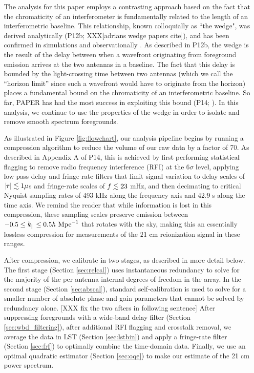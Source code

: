 \documentclass[twocolumn,numberedappendix]{emulateapj} \shorttitle{New Limits on the 21 cm Power Spectrum at $z=8.4$}
\newcommand{\hMpci}{h\ {\rm Mpc}^{-1}}
\begin{document}
The analysis for this paper employs a contrasting
approach based on the fact that the chromaticity of an interferometer
is fundamentally related to the length of an interferometric baseline.  This relationship, known
colloquially as ``the wedge", was 
derived analytically (P12b; \citealt{vedantham_et_al2012}XXX[adrians wedge papers cite]), and has been confirmed in 
simulations \citep{datta_et_al2010,hazelton_et_al2013} and observationally
\citep{pober_et_al2013,dillon_et_al2013b}.  As described in P12b, the wedge is the result of the delay
between when a wavefront originating from foreground emission
arrives at the two antennas in a baseline.  The fact that this delay is bounded by the light-crossing
time between two antennas (which we call the ``horizon limit'' since such a wavefront would have to 
originate from the horizon) places a fundamental bound on the chromaticity of
an interferometric baseline.  So far, PAPER has had the most success in exploiting this bound
(P14; \citealt{jacobs_et_al2014}). 
In this analysis, we continue to use the properties of the 
wedge in order to isolate and remove smooth
spectrum foregrounds.

As illustrated in Figure \ref{fig:flowchart},
our analysis pipeline begins by running a compression
algorithm to reduce the volume of our raw data by a factor of 70.
As described in Appendix A of P14, this is achieved by first performing statistical flagging to remove
radio frequency interference (RFI) at the 6$\sigma$ level, applying low-pass delay and fringe-rate filters that limit signal variation
to delay scales of $|\tau|\lesssim1 \mu$s and fringe-rate scales of $f\lesssim23$ mHz, and then 
decimating to critical Nyquist sampling rates of 493 kHz along the frequency axis
and 42.9 s along the time axis.  We remind the reader that while information is lost in this compression,
these sampling scales preserve emission between
$-0.5\le k_\parallel\le 0.5\hMpci$ that rotates with the sky, making this an essentially lossless compression 
for measurements of the 21 cm reionization signal in these ranges.

After compression, we calibrate in two stages, as described in more detail below.  
The first stage (Section \ref{sec:relcal}) uses instantaneous redundancy to solve for the majority of the 
per-antenna internal degrees of freedom in the array.  In the second stage (Section \ref{sec:abscal}), standard self-calibration is used 
to solve for a smaller number of
absolute phase and gain parameters that cannot be solved by redundancy alone. 
[XXX fix the two afters in following sentence]
After suppressing foregrounds with a
wide-band delay filter (Section \ref{sec:wbd_filtering}), after additional RFI flagging and crosstalk removal, 
we average the data in LST (Section \ref{sec:lstbin}) and apply a
fringe-rate filter (Section \ref{sec:frf}) to optimally combine the time-domain data. 
Finally, we use an
optimal quadratic estimator (Section \ref{sec:oqe}) to make our estimate of the 21 cm power spectrum.
\end{document}
